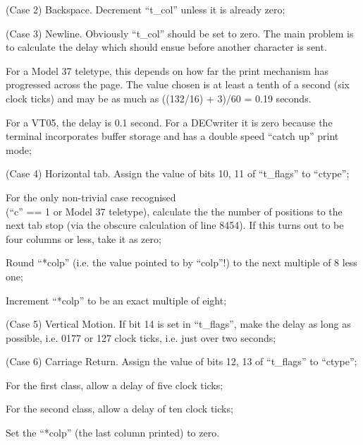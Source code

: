 \item[8434:] (Case 2) Backspace. Decrement
``t\_col'' unless it is already
zero;

\item[8439:] (Case 3) Newline. Obviously
``t\_col'' should be set to zero.
The main problem is to calculate
the delay which should ensue
before another character is sent.

For a Model 37 teletype, this
depends on how far the print
mechanism has progressed across
the page. The value chosen is at
least a tenth of a second (six
clock ticks) and may be as much
as ((132/16) + 3)/60 =   0.19
seconds.

For a VT05, the delay is 0.1
second. For a DECwriter it is
zero because the terminal
incorporates buffer storage and
has a double speed ``catch up''
print mode;

\item[8451:] (Case 4) Horizontal tab. Assign
the value of bits 10, 11 of
``t\_flags'' to ``ctype'';

\item[8453:] For the only non-trivial case
recognised\\
(``c'' ==  1 or Model 37
teletype), calculate the the
number of positions to the next
tab stop (via the obscure calculation of line 8454). If this
turns out to be four columns or
less, take it as zero;

\item[8458:] Round ``*colp'' (i.e. the value
pointed to by ``colp''!) to the
next multiple of 8 less one;

\item[8459:] Increment ``*colp'' to be an exact
multiple of eight;

\item[8462:] (Case 5) Vertical Motion. If bit
14 is set in ``t\_flags'', make the
delay as long as possible, i.e.
0177 or 127 clock ticks, i.e.
just over two seconds;

\item[8467:] (Case 6) Carriage Return. Assign
the value of bits 12, 13 of
``t\_flags'' to ``ctype'';

\item[8469:] For the first class, allow a
delay of five clock ticks;

\item[8472:] For the second class, allow a
delay of ten clock ticks;

\item[8475:] Set the ``*colp'' (the last column
printed) to zero.
\ed

